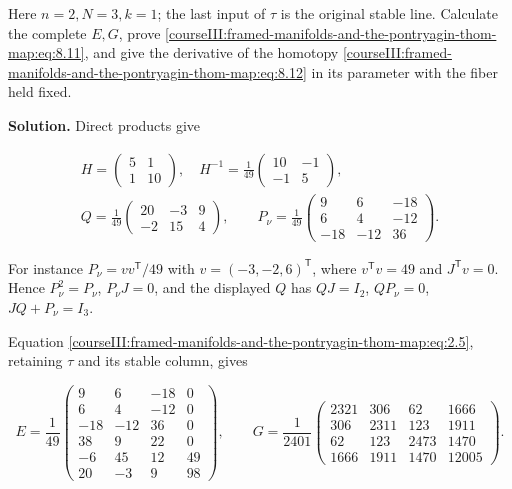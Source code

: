 Here \(n=2,N=3,k=1\); the last input of \(\tau\) is the original stable line. Calculate the complete \(E,G\), prove \eqref{courseIII:framed-manifolds-and-the-pontryagin-thom-map:eq:8.11}, and give the derivative of the homotopy \eqref{courseIII:framed-manifolds-and-the-pontryagin-thom-map:eq:8.12} in its parameter with the fiber held fixed.

\textbf{Solution.} Direct products give

\begin{equation}
\begin{gathered}
 H=\begin{pmatrix}5&1\\1&10\end{pmatrix},\quad
 H^{-1}=\frac1{49}\begin{pmatrix}10&-1\\-1&5\end{pmatrix},\\
 Q=\frac1{49}\begin{pmatrix}20&-3&9\\-2&15&4\end{pmatrix},\qquad
 P_\nu=\frac1{49}\begin{pmatrix}9&6&-18\\6&4&-12\\-18&-12&36\end{pmatrix}.
 \end{gathered}
 \label{courseIII:framed-manifolds-and-the-pontryagin-thom-map:eq:9.10}
\end{equation}

For instance \(P_\nu=vv^{\mathsf T}/49\) with \(v=(-3,-2,6)^{\mathsf T}\), where \(v^{\mathsf T}v=49\) and \(J^{\mathsf T}v=0\). Hence \(P_\nu^2=P_\nu\), \(P_\nu J=0\), and the displayed \(Q\) has \(QJ=I_2\), \(QP_\nu=0\), \(JQ+P_\nu=I_3\).

Equation \eqref{courseIII:framed-manifolds-and-the-pontryagin-thom-map:eq:2.5}, retaining \(\tau\) and its stable column, gives

\begin{equation}
E=\frac1{49}
 \begin{pmatrix}
 9&6&-18&0\\
 6&4&-12&0\\
 -18&-12&36&0\\
 38&9&22&0\\
 -6&45&12&49\\
 20&-3&9&98
 \end{pmatrix},\qquad
 G=\frac1{2401}
 \begin{pmatrix}
 2321&306&62&1666\\
 306&2311&123&1911\\
 62&123&2473&1470\\
 1666&1911&1470&12005
 \end{pmatrix}.
 \label{courseIII:framed-manifolds-and-the-pontryagin-thom-map:eq:9.11}
\end{equation}

